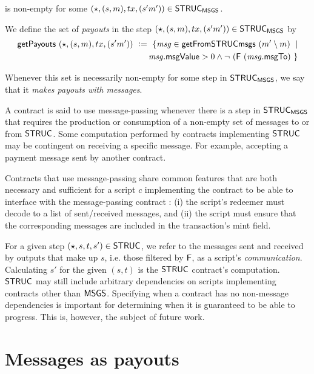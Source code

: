 is non-empty for some $(\star, (s, m), tx, (s' m')) \in \mathsf{STRUC}_{\mathsf{MSGS}}$. \newline

We define the set of \emph{payouts} in the step $(\star, (s, m), tx, (s' m')) \in \mathsf{STRUC}_{\mathsf{MSGS}}$ by
\begin{align*}
  \mathsf{getPayouts}~(\star, (s, m), tx, (s' m'))~\mathrel{\mathop:}=~\{ \mathit{msg} \in \mathsf{getFromSTRUCmsgs}~(m' \setminus m) ~\mid \\ ~~~~\mathit{msg}.\mathsf{msgValue} > 0 \wedge
  \neg~(\mathsf{F}~(\mathit{msg}.\mathsf{msgTo}) ~\}
\end{align*}

Whenever this set is necessarily non-empty for some step in $\mathsf{STRUC}_{\mathsf{MSGS}}$, we say that it
\emph{makes payouts with messages}.

A contract is said to use message-passing whenever there is a step in $\mathsf{STRUC}_{\mathsf{MSGS}}$ that
requires the production or consumption of a non-empty set of messages to or from $\mathsf{STRUC}$.
Some computation performed by contracts implementing $\mathsf{STRUC}$ may be contingent on receiving a specific
message. For example, accepting a payment message sent by another contract.

Contracts that use message-passing share common features that are both necessary
and sufficient for a script $c$ implementing the contract to be able to
interface with the message-passing contract :
(i) the script's redeemer must decode to a list of sent/received messages, and (ii)
the script must ensure that the corresponding messages are included in the
transaction's mint field.

For a given step $(\star, s, t, s') \in \mathsf{STRUC}$, we refer to the messages sent and received
by outputs that make up $s$, i.e. those filtered by $\mathsf{F}$, as a script's
\emph{communication}. Calculating $s'$ for the given $(s, t)$
is the $\mathsf{STRUC}$ contract's
computation. $\mathsf{STRUC}$ may still include arbitrary dependencies on scripts implementing
contracts other than $\mathsf{MSGS}$. Specifying when a contract has no non-message
dependencies is important for determining when it is guaranteed to be able to progress.
This is, however, the subject of future work.

\section{Messages as payouts}
\label{sec:msgs-pay}

